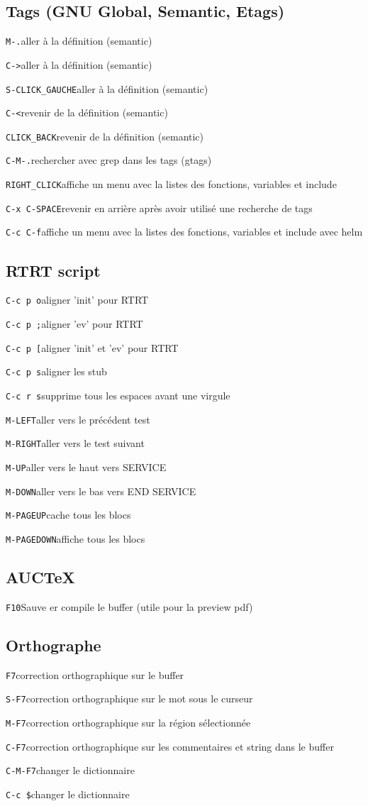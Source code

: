 \documentclass[10pt,landscape]{article}
\def\cm#1#2{{\tt#1}\dotfill#2\par}
\begin{document}
\begin{multicols}{3}
\subsection{Tags (GNU Global, Semantic, Etags)}
\cm{M-.}{aller à la définition (semantic)}
\cm{C-\textgreater}{aller à la définition (semantic)}
\cm{S-CLICK\_GAUCHE}{aller à la définition (semantic)}
\cm{C-\textless}{revenir de la définition (semantic)}
\cm{CLICK\_BACK}{revenir de la définition (semantic)}
\cm{C-M-.}{rechercher avec grep dans les tags (gtags)}
\cm{RIGHT\_CLICK}{affiche un menu avec la listes des fonctions, variables et include}
\cm{C-x C-SPACE}{revenir en arrière après avoir utilisé une recherche de tags}
\cm{C-c C-f}{affiche un menu avec la listes des fonctions, variables et include avec helm}





\subsection{RTRT script}
\cm{C-c p o}{aligner 'init' pour RTRT}
\cm{C-c p ;}{aligner 'ev' pour RTRT}
\cm{C-c p [}{aligner 'init' et 'ev' pour RTRT}
\cm{C-c p s}{aligner les stub}
\cm{C-c r s}{supprime tous les espaces avant une virgule}
\cm{M-LEFT}{aller vers le précédent test}
\cm{M-RIGHT}{aller vers le test suivant}
\cm{M-UP}{aller vers le haut vers SERVICE}
\cm{M-DOWN}{aller vers le bas vers END SERVICE}
\cm{M-PAGEUP}{cache tous les blocs}
\cm{M-PAGEDOWN}{affiche tous les blocs}





\subsection{AUCTeX}
\cm{F10}{Sauve er compile le buffer (utile pour la preview pdf)}





\subsection{Orthographe}
\cm{F7}{correction orthographique sur le buffer}
\cm{S-F7}{correction orthographique sur le mot sous le curseur}
\cm{M-F7}{correction orthographique sur la région sélectionnée}
\cm{C-F7}{correction orthographique sur les commentaires et string dans le buffer}
\cm{C-M-F7}{changer le dictionnaire}
\cm{C-c \$}{changer le dictionnaire}






\end{multicols}
\end{document}
